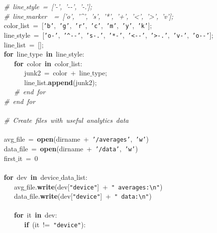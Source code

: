 \mbox{}\ \ \ \textit{\#\ line$\_$style\ =\ ['-',\ '-\/-',\ '-.'];} \\
\mbox{}\ \ \ \textit{\#\ line$\_$marker\ \ =\ ['o',\ '\textasciicircum{}',\ 's',\ '*',\ '+',\ '\textless{}',\ '\textgreater{}',\ 'v'];} \\
\mbox{}\ \ \ color$\_$list\ =\ [\texttt{'b'},\ \texttt{'g'},\ \texttt{'r'},\ \texttt{'c'},\ \texttt{'m'},\ \texttt{'y'},\ \texttt{'k'}]; \\
\mbox{}\ \ \ line$\_$style\ =\ [\texttt{'o-'},\ \texttt{'\textasciicircum{}-\/-'},\ \texttt{'s-.'},\ \texttt{'*-'},\ \texttt{'\textless{}-\/-'},\ \texttt{'\textgreater{}-.'},\ \texttt{'v-'},\ \texttt{'o-\/-'}]; \\
\mbox{}\ \ \ line$\_$list\ =\ []; \\
\mbox{}\ \ \ \textbf{for}\ line$\_$type\ \textbf{in}\ line$\_$style: \\
\mbox{}\ \ \ \ \ \ \textbf{for}\ color\ \textbf{in}\ color$\_$list: \\
\mbox{}\ \ \ \ \ \ \ \ \ junk2\ =\ color\ +\ line$\_$type; \\
\mbox{}\ \ \ \ \ \ \ \ \ line$\_$list.\textbf{append}(junk2); \\
\mbox{}\ \ \ \ \ \ \textit{\#\ end\ for} \\
\mbox{}\ \ \ \textit{\#\ end\ for} \\
\mbox{} \\
\mbox{}\ \ \ \textit{\#\ Create\ files\ with\ useful\ analytics\ data\ \ \ } \\
\mbox{} \\
\mbox{}\ \ \ avg$\_$file\ =\ \textbf{open}(dirname\ +\ \texttt{'/averages'},\ \texttt{'w'}) \\
\mbox{}\ \ \ data$\_$file\ =\ \textbf{open}(dirname\ +\ \texttt{'/data'},\ \texttt{'w'}) \\
\mbox{}\ \ \ first$\_$it\ =\ 0 \\
\mbox{} \\
\mbox{}\ \ \ \textbf{for}\ dev\ \textbf{in}\ device$\_$data$\_$list: \\
\mbox{}\ \ \ \ \ \ avg$\_$file.\textbf{write}(dev[\texttt{"{}device"{}}]\ +\ \texttt{"{}\ averages:\textbackslash{}n"{}}) \\
\mbox{}\ \ \ \ \ \ data$\_$file.\textbf{write}(dev[\texttt{"{}device"{}}]\ +\ \texttt{"{}\ data:\textbackslash{}n"{}}) \\
\mbox{} \\
\mbox{}\ \ \ \ \ \ \textbf{for}\ it\ \textbf{in}\ dev: \\
\mbox{}\ \ \ \ \ \ \ \ \ \textbf{if}\ (it\ !=\ \texttt{"{}device"{}}): \\

